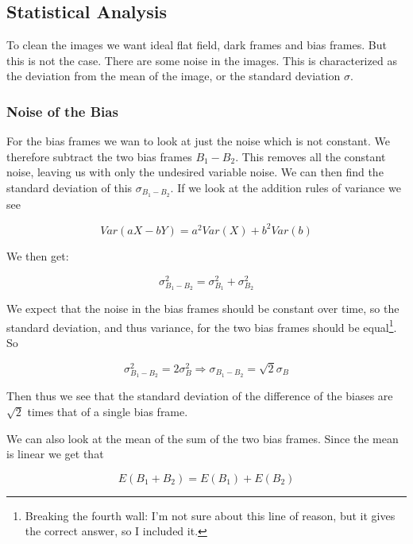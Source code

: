\documentclass{emulateapj}
\begin{document}
\subsection{Statistical Analysis}
To clean the images we want ideal flat field, dark frames and bias frames. But this is not the case. There are some noise in the images. This is characterized as the deviation from the mean of the image, or the standard deviation $\sigma$.

\subsubsection{Noise of the Bias}
\label{sec:noiseBias}
For the bias frames we wan to look at just the noise which is not constant. We therefore subtract the two bias frames $B_1 - B_2$. This removes all the constant noise, leaving us with only the undesired variable noise. We can then find the standard deviation of this $\sigma_{B_1 - B_2}$. If we look at the addition rules of variance \citep{wiki:var} we see

\begin{equation}
Var(aX - bY) = a^2Var(X) + b^2Var(b)
\end{equation}

We then get:

\begin{equation}
\sigma_{B_1 - B_2}^2 = \sigma_{B_1}^2 + \sigma_{B_2}^2
\end{equation}

We expect that the noise in the bias frames should be constant over time, so the standard deviation, and thus variance, for the two bias frames should be equal\footnote{Breaking the fourth wall: I'm not sure about this line of reason, but it gives the correct answer, so I included it.}. So

\begin{equation}
\sigma_{B_1 - B_2}^2 = 2\sigma_{B}^2 \Rightarrow \sigma_{B_1 - B_2} = \sqrt{2}\sigma_B
\label{eq:stdB1B2}
\end{equation}

Then thus we see that the standard deviation of the difference of the biases are $\sqrt{2}$ times that of a single bias frame.

We can also look at the mean of the sum of the two bias frames. Since the mean is linear we get that

\begin{equation}
E(B_1 + B_2) = E(B_1) + E(B_2)
\label{eq:meanB}
\end{equation}
\end{document}
